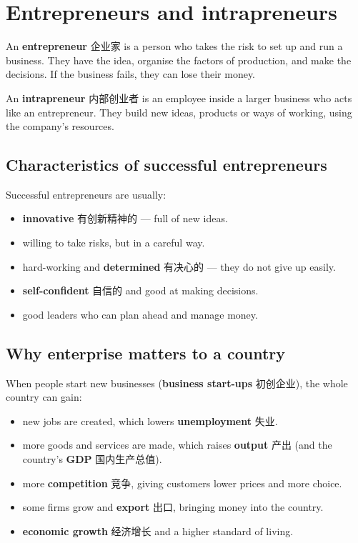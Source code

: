 \documentclass[11pt]{article}
\begin{document}
\section*{Entrepreneurs and intrapreneurs}

An \textbf{entrepreneur} 企业家 is a person who takes the risk to set up and run a business. They have the idea, organise the factors of production, and make the decisions. If the business fails, they can lose their money.

An \textbf{intrapreneur} 内部创业者 is an employee inside a larger business who acts like an entrepreneur. They build new ideas, products or ways of working, using the company's resources.

\subsection*{Characteristics of successful entrepreneurs}

Successful entrepreneurs are usually:

\begin{itemize}
\item \textbf{innovative} 有创新精神的 — full of new ideas.

\item willing to take risks, but in a careful way.

\item hard-working and \textbf{determined} 有决心的 — they do not give up easily.

\item \textbf{self-confident} 自信的 and good at making decisions.

\item good leaders who can plan ahead and manage money.

\end{itemize}

\subsection*{Why enterprise matters to a country}

When people start new businesses (\textbf{business start-ups} 初创企业), the whole country can gain:

\begin{itemize}
\item new jobs are created, which lowers \textbf{unemployment} 失业.

\item more goods and services are made, which raises \textbf{output} 产出 (and the country's \textbf{GDP} 国内生产总值).

\item more \textbf{competition} 竞争, giving customers lower prices and more choice.

\item some firms grow and \textbf{export} 出口, bringing money into the country.

\item \textbf{economic growth} 经济增长 and a higher standard of living.

\end{itemize}
\end{document}
